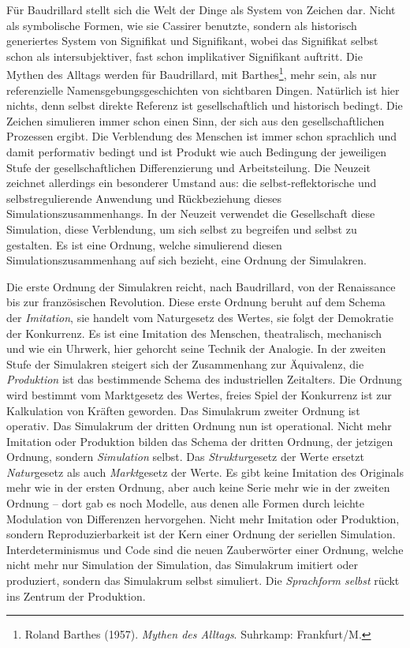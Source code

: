 \documentclass[12pt,a4paper]{article}
\begin{document}
Für Baudrillard stellt sich die Welt der Dinge als System von Zeichen dar.
Nicht als symbolische Formen, wie sie Cassirer benutzte, sondern als
historisch generiertes System von Signifikat und Signifikant, wobei das
Signifikat selbst schon als intersubjektiver, fast schon implikativer
Signifikant auftritt. Die Mythen des Alltags werden für Baudrillard, mit
Barthes\footnote{Roland Barthes (1957). \emph{Mythen des Alltags}. Suhrkamp:
  Frankfurt/M. }, mehr sein, als nur referenzielle Namensgebungsgeschichten
von sichtbaren Dingen. Natürlich ist hier nichts, denn selbst direkte Referenz
ist gesellschaftlich und historisch bedingt. Die Zeichen simulieren immer
schon einen Sinn, der sich aus den gesellschaftlichen Prozessen ergibt. Die
Verblendung des Menschen ist immer schon sprachlich und damit performativ
bedingt und ist Produkt wie auch Bedingung der jeweiligen Stufe der
gesellschaftlichen Differenzierung und Arbeitsteilung. Die Neuzeit zeichnet
allerdings ein besonderer Umstand aus: die selbst-reflektorische und
selbstregulierende Anwendung und Rückbeziehung dieses
Simulationszusammenhangs.  In der Neuzeit verwendet die Gesellschaft diese
Simulation, diese Verblendung, um sich selbst zu begreifen und selbst zu
gestalten. Es ist eine Ordnung, welche simulierend diesen
Simulationszusammenhang auf sich bezieht, eine Ordnung der Simulakren.

Die erste Ordnung der Simulakren reicht, nach Baudrillard, von der Renaissance
bis zur französischen Revolution. Diese erste Ordnung beruht auf dem Schema
der \emph{Imitation}, sie handelt vom Naturgesetz des Wertes, sie folgt der
Demokratie der Konkurrenz. Es ist eine Imitation des Menschen, theatralisch,
mechanisch und wie ein Uhrwerk, hier gehorcht seine Technik der Analogie. In
der zweiten Stufe der Simulakren steigert sich der Zusammenhang zur
Äquivalenz, die \emph{Produktion} ist das bestimmende Schema des industriellen
Zeitalters. Die Ordnung wird bestimmt vom Marktgesetz des Wertes, freies Spiel
der Konkurrenz ist zur Kalkulation von Kräften geworden. Das Simulakrum
zweiter Ordnung ist operativ. Das Simulakrum der dritten Ordnung nun ist
operational.  Nicht mehr Imitation oder Produktion bilden das Schema der
dritten Ordnung, der jetzigen Ordnung, sondern \emph{Simulation} selbst. Das
\emph{Struktur}gesetz der Werte ersetzt \emph{Natur}gesetz als auch
\emph{Markt}gesetz der Werte.  Es gibt keine Imitation des Originals mehr wie
in der ersten Ordnung, aber auch keine Serie mehr wie in der zweiten Ordnung
-- dort gab es noch Modelle, aus denen alle Formen durch leichte Modulation
von Differenzen hervorgehen. Nicht mehr Imitation oder Produktion, sondern
Reproduzierbarkeit ist der Kern einer Ordnung der seriellen Simulation.
Interdeterminismus und Code sind die neuen Zauberwörter einer Ordnung, welche
nicht mehr nur Simulation der Simulation, das Simulakrum imitiert oder
produziert, sondern das Simulakrum selbst simuliert. Die \emph{Sprachform
  selbst} rückt ins Zentrum der Produktion.
\end{document}
